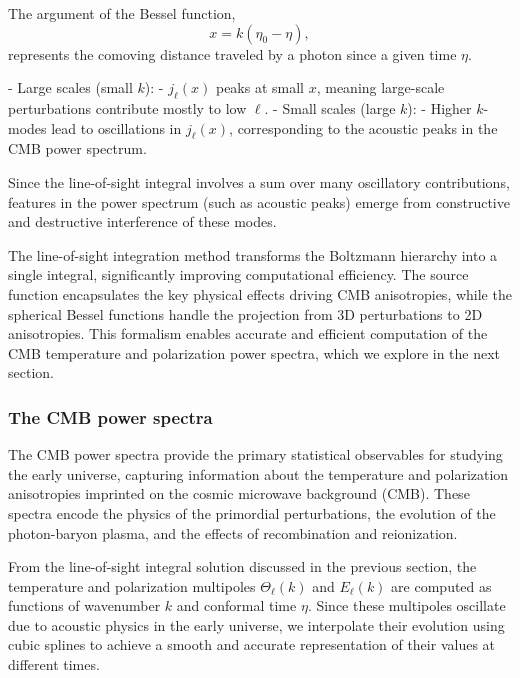 \documentclass{aa}
\begin{document}
The argument of the Bessel function,
\begin{equation}
x = k (\eta_0 - \eta),
\end{equation}
represents the comoving distance traveled by a photon since a given time $\eta$.  

- Large scales (small $k$):  
  - $j_\ell(x)$ peaks at small $x$, meaning large-scale perturbations contribute mostly to low $\ell$.  
- Small scales (large $k$):  
  - Higher $k$-modes lead to oscillations in $j_\ell(x)$, corresponding to the acoustic peaks in the CMB power spectrum.  

Since the line-of-sight integral involves a sum over many oscillatory contributions, features in the power spectrum (such as acoustic peaks) emerge from constructive and destructive interference of these modes.

The line-of-sight integration method transforms the Boltzmann hierarchy into a single integral, significantly improving computational efficiency. The source function encapsulates the key physical effects driving CMB anisotropies, while the spherical Bessel functions handle the projection from 3D perturbations to 2D anisotropies. This formalism enables accurate and efficient computation of the CMB temperature and polarization power spectra, which we explore in the next section.
\color{black}





\subsubsection{The CMB power spectra}
\color{Plum}
The CMB power spectra provide the primary statistical observables for studying the early universe, capturing information about the temperature and polarization anisotropies imprinted on the cosmic microwave background (CMB). These spectra encode the physics of the primordial perturbations, the evolution of the photon-baryon plasma, and the effects of recombination and reionization.  

From the line-of-sight integral solution discussed in the previous section, the temperature and polarization multipoles $\Theta_\ell(k)$ and $E_\ell(k)$ are computed as functions of wavenumber $k$ and conformal time $\eta$. Since these multipoles oscillate due to acoustic physics in the early universe, we interpolate their evolution using cubic splines to achieve a smooth and accurate representation of their values at different times.  
\end{document}
